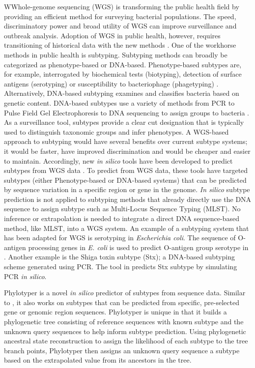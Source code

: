 \documentclass{bioinfo}
\begin{document}
WWhole-genome sequencing (WGS) is transforming the public health field by providing an efficient method for surveying bacterial populations.
The speed, discriminatory power and broad utility of WGS can improve surveillance and outbreak analysis.
Adoption of WGS in public health, however, requires transitioning of historical data with the new methods \citep{Jenkins2015}.
One of the workhorse methods in public health is subtyping.
Subtyping methods can broadly be categorized as phenotype-based or DNA-based.
Phenotype-based subtypes are, for example, interrogated by biochemical tests (biotyping), detection of surface antigens (serotyping) or susceptibility to bacteriophage (phagetyping) \citep{Wiedmann2002}.
Alternatively, DNA-based subtyping examines and classifies bacteria based on genetic content.
DNA-based subtypes use a variety of methods from PCR to Pulse Field Gel Electrophoresis to DNA sequencing to assign groups to bacteria \citep{Wiedmann2002}.
As a surveillance tool, subtypes provide a clear cut designation that is typically used to distinguish taxonomic groups and infer phenotypes.
A WGS-based approach to subtyping would have several benefits over current subtype systems; it would be faster, have improved discrimination and would be cheaper and easier to maintain\citep{Jenkins2015}.
Accordingly, new \textit{in silico} tools have been developed to predict subtypes from WGS data \citep{Joensen2015,Ingle2016,CARRILLO2016}.
To predict from WGS data, these tools have targeted subtypes (either Phenotype-based or DNA-based systems) that can be predicted by sequence variation in a specific region or gene in the genome.
\textit{In silico} subtype prediction is not applied to subtyping methods that already directly use the DNA sequence to assign subtype such as Multi-Locus Sequence Typing (MLST). 
No inference or extrapolation is needed to integrate a direct DNA sequence-based method, like MLST, into a WGS system.
An example of a subtyping system that has been adapted for WGS is serotyping in \textit{Escherichia coli}.
The sequence of O-antigen processing genes in \textit{E. coli} is used to predict O-antigen group serotype in \citep{Joensen2015,Ingle2016}.
Another example is the Shiga toxin subtype (Stx); a DNA-based subtyping scheme generated using PCR.
The tool in \citep{CARRILLO2016} predicts Stx subtype by simulating PCR \textit{in silico}.

Phylotyper is a novel \textit{in silico} predictor of subtypes from sequence data.
Similar to \citep{Joensen2015,Ingle2016,CARRILLO2016}, it also works on subtypes that can be predicted from specific, pre-selected gene or genomic region sequences.
Phylotyper is unique in that it builds a phylogenetic tree consisting of reference sequences with known subtype and the unknown query sequences to help inform subtype prediction.
Using phylogenetic ancestral state reconstruction to assign the likelihood of each subtype to the tree branch points, Phylotyper then assigns an unknown query sequence a subtype based on the extrapolated value from its ancestors in the tree.
\end{document}
